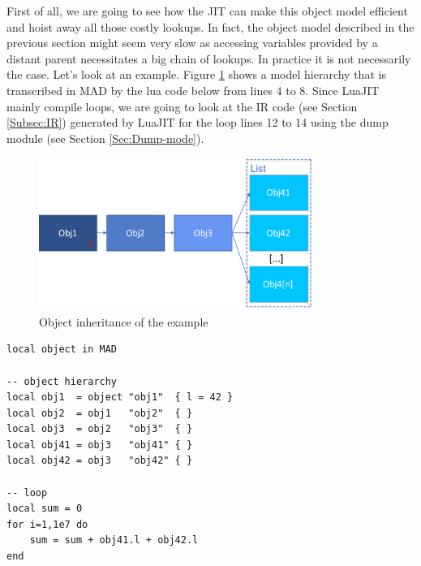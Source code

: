 
First of all, we are going to see how the JIT can make this object model
efficient and hoist away  all those costly lookups. In fact, the object model
described in the previous section might seem very slow as accessing variables
provided by a distant parent necessitates a big chain of lookups. In practice it
is not necessarily the case. Let's look at an example. Figure \ref{fig:MO-ex}
shows a model hierarchy that is transcribed in MAD by the lua code below from
lines 4 to 8. Since LuaJIT mainly compile loops, we are going to look at the IR
code (see Section \ref{Subsec:IR}) generated by LuaJIT for the loop lines 12 to 14
using the dump module (see Section \ref{Sec:Dump-mode}).

\begin{figure}[H]
    \centering
    \includegraphics[width=0.8\textwidth]{./Images/MO-ex.pdf}
    \caption{Object inheritance of the example}
    \label{fig:MO-ex}
\end{figure}

\begin{lstlisting}[style=LuaStyle]
local object in MAD

-- object hierarchy
local obj1  = object "obj1"  { l = 42 }
local obj2  = obj1   "obj2"  { }
local obj3  = obj2   "obj3"  { }
local obj41 = obj3   "obj41" { }
local obj42 = obj3   "obj42" { }

-- loop
local sum = 0
for i=1,1e7 do
	sum = sum + obj41.l + obj42.l
end
\end{lstlisting}


